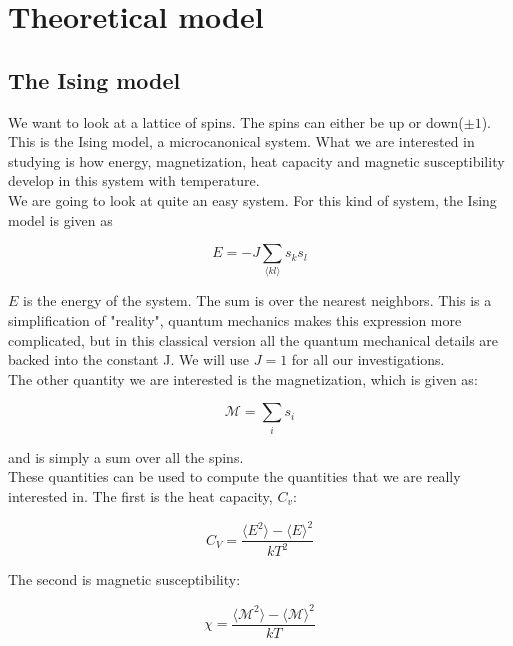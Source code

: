 \documentclass[a4paper, 10pt]{article}
\begin{document}
\section{Theoretical model}
\subsection{The Ising model}

We want to look at a lattice of spins. The spins can either be up or down($\pm 1$). This is the Ising model, a microcanonical system. What we are interested in studying is how  energy, magnetization, heat capacity and magnetic susceptibility develop in this system with temperature.\\

We are going to look at quite an easy system. For this kind of system, the Ising model is given as

\begin{equation}\label{eq:ising_system_energy}
E=-J\sum_{\langle kl \rangle} s_ks_l
\end{equation}

$E$ is the energy of the system. The sum is over the nearest neighbors. This is a simplification of "reality", quantum mechanics makes this expression more complicated, but in this classical version all the quantum mechanical details are backed into the constant J. We will use $J=1$ for all our investigations.\\

The other quantity we are interested is the magnetization,  which is given as:

\begin{equation}
\mathcal{M}=\sum_i s_i
\end{equation}

and is simply a sum over all the spins.\\

These quantities can be used to compute the  quantities that we are really interested in. The first is the heat capacity, $C_v$:


\begin{equation}\label{eq:heat_capacity}
C_V=\frac{\langle E^2\rangle - \langle E \rangle^2}{kT^2}
\end{equation}

The second is magnetic susceptibility:

\begin{equation}\label{eq:magnetic_susp}
\chi=\frac{\langle \mathcal{M}^2\rangle - \langle \mathcal{M} \rangle^2}{kT}
\end{equation}
\end{document}
